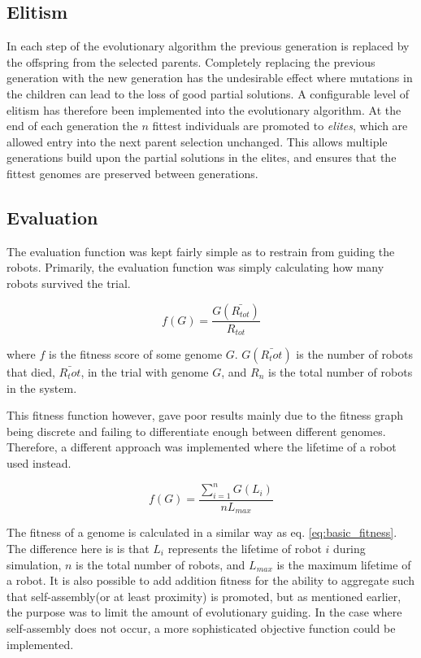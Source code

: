 \subsection{Elitism}
In each step of the evolutionary algorithm the previous generation is replaced by the offspring from the selected parents.
Completely replacing the previous generation with the new generation has the undesirable effect where mutations in the children can lead to the loss of good partial solutions.
A configurable level of elitism has therefore been implemented into the evolutionary algorithm.
At the end of each generation the $n$ fittest individuals are promoted to \emph{elites}, which are allowed entry into the next parent selection unchanged.
This allows multiple generations build upon the partial solutions in the elites, and ensures that the fittest genomes are preserved between generations.

\subsection{Evaluation}
The evaluation function was kept fairly simple as to restrain from guiding the robots.
Primarily, the evaluation function was simply calculating how many robots survived the trial.

\begin{equation}
	\label{eq:basic_fitness}
	f(G) = \frac{G(\bar{R_{tot}})}{R_{tot}}
\end{equation}

where $f$ is the fitness score of some genome $G$.
$G(\bar{R_tot})$ is the number of robots that died, $\bar{R_tot}$, in the trial with genome $G$, and $R_n$ is the total number of robots in the system.

This fitness function however, gave poor results mainly due to the fitness graph being discrete and failing to differentiate enough between different genomes.
Therefore, a different approach was implemented where the lifetime of a robot used instead.

\begin{equation}
	f(G) = \frac{\sum_{i=1}^n G(L_i)}{nL_{max}}
\end{equation}

The fitness of a genome is calculated in a similar way as eq. \ref{eq:basic_fitness}.
The difference here is is that $L_i$ represents the lifetime of robot $i$ during simulation, $n$ is the total number of robots, and $L_{max}$ is the maximum lifetime of a robot.
It is also possible to add addition fitness for the ability to aggregate such that self-assembly(or at least proximity) is promoted, but as mentioned earlier, the purpose was to limit the amount of evolutionary guiding.
In the case where self-assembly does not occur, a more sophisticated objective function could be implemented.
		
